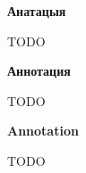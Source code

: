 \begin{center}
    {\bf Анатацыя}
\end{center}

TODO

\begin{center}
    {\bf Аннотация}
\end{center}

TODO

\begin{center}
    {\bf Annotation}
\end{center}

TODO

\newpage
